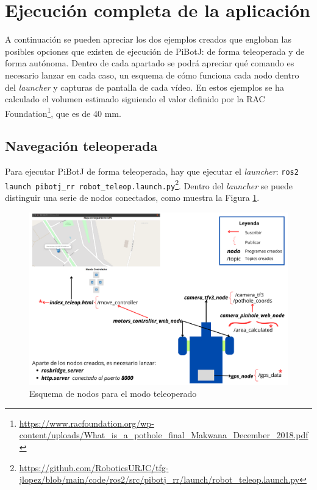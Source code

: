 \section{Ejecución completa de la aplicación}
\label{sec:expcompleto}
A continuación se pueden apreciar los dos ejemplos creados que engloban las posibles opciones que existen de ejecución de PiBotJ: de forma teleoperada y de forma autónoma. Dentro de cada apartado se podrá apreciar qué comando es necesario lanzar en cada caso, un esquema de cómo funciona cada nodo dentro del \textit{launcher} y capturas de pantalla de cada vídeo. En estos ejemplos se ha calculado el volumen estimado siguiendo el valor definido por la RAC Foundation\footnote{\url{https://www.racfoundation.org/wp-content/uploads/What_is_a_pothole_final_Makwana_December_2018.pdf}}, que es de 40 mm. 

\subsection{Navegación teleoperada}

Para ejecutar PiBotJ de forma teleoperada, hay que ejecutar el \textit{launcher}: \verb|ros2 launch pibotj_rr robot_teleop.launch.py|\footnote{\url{https://github.com/RoboticsURJC/tfg-jlopez/blob/main/code/ros2/src/pibotj_rr/launch/robot_teleop.launch.py}}. Dentro del \textit{launcher} se puede distinguir una serie de nodos conectados, como muestra la Figura \ref{fig:nodosteleop}. 

\begin{figure} [h!]
	\begin{center}
			\includegraphics[width=15cm]{figs/cap7/esquema_nodos_teleoperado_ampliado.png}
		\end{center}
	\caption{Esquema de nodos para el modo teleoperado}
	\label{fig:nodosteleop}
\end{figure}
 
